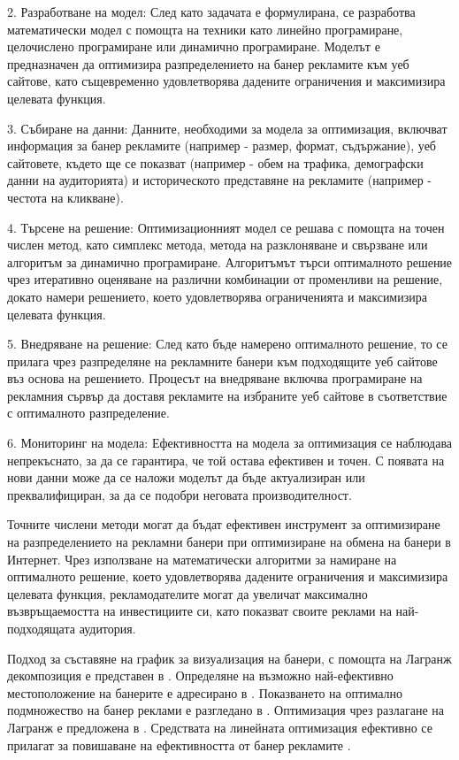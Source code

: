 2. Разработване на модел: След като задачата е формулирана, се разработва математически модел с помощта на техники като линейно програмиране, целочислено програмиране или динамично програмиране. Моделът е предназначен да оптимизира разпределението на банер рекламите към уеб сайтове, като същевременно удовлетворява дадените ограничения и максимизира целевата функция.

3. Събиране на данни: Данните, необходими за модела за оптимизация, включват информация за банер рекламите (например - размер, формат, съдържание), уеб сайтовете, където ще се показват (например - обем на трафика, демографски данни на аудиторията) и историческото представяне на рекламите (например - честота на кликване).

4. Търсене на решение: Оптимизационният модел се решава с помощта на точен числен метод, като симплекс метода, метода на разклоняване и свързване или алгоритъм за динамично програмиране. Алгоритъмът търси оптималното решение чрез итеративно оценяване на различни комбинации от променливи на решение, докато намери решението, което удовлетворява ограниченията и максимизира целевата функция.

5. Внедряване на решение: След като бъде намерено оптималното решение, то се прилага чрез разпределяне на рекламните банери към подходящите уеб сайтове въз основа на решението. Процесът на внедряване включва програмиране на рекламния сървър да доставя рекламите на избраните уеб сайтове в съответствие с оптималното разпределение.

6. Мониторинг на модела: Ефективността на модела за оптимизация се наблюдава непрекъснато, за да се гарантира, че той остава ефективен и точен. С появата на нови данни може да се наложи моделът да бъде актуализиран или преквалифициран, за да се подобри неговата производителност.

Точните числени методи могат да бъдат ефективен инструмент за оптимизиране на разпределението на рекламни банери при оптимизиране на обмена на банери в Интернет. Чрез използване на математически алгоритми за намиране на оптималното решение, което удовлетворява дадените ограничения и максимизира целевата функция, рекламодателите могат да увеличат максимално възвръщаемостта на инвестициите си, като показват своите реклами на най-подходящата аудитория.

Подход за съставяне на график за визуализация на банери, с помощта на Лагранж декомпозиция е представен в \cite{10.1145/945846.945848}. Определяне на възможно най-ефективно местоположение на банерите е адресирано в \cite{Kaul2018}. Показването на оптимално подмножество на банер реклами е разгледано в \cite{https://doi.org/10.1002/jos.74}. Оптимизация чрез разлагане на Лагранж е предложена в \cite{doi:10.1287/ijoc.1020.0003}. Средствата на линейната оптимизация ефективно се прилагат за повишаване на ефективността от банер рекламите \cite{doi:10.1287/inte.33.5.71.19248,dawande2003performance,dawande2005scheduling}.

